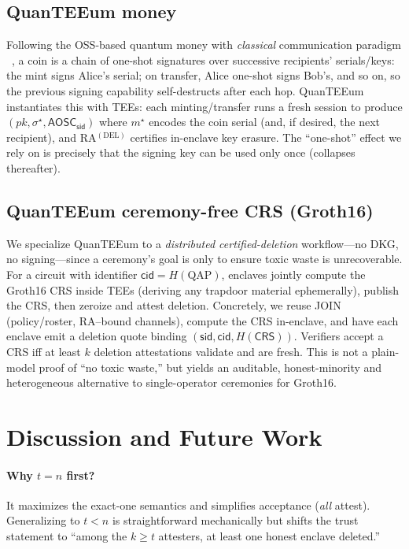 \documentclass[runningheads,orivec]{llncs}
\newcommand{\prot}{\textsf{QuanTEEum}}
\newcommand{\sid}{\mathsf{sid}}
\begin{document}
\subsection{QuanTEEum money}
Following the OSS-based quantum money with \emph{classical} communication paradigm ~\cite{shmueli2025one}, a coin is a chain of one-shot signatures over successive recipients’ serials/keys: the mint signs Alice’s serial; on transfer, Alice one-shot signs Bob’s, and so on, so the previous signing capability self-destructs after each hop. \prot{} instantiates this with TEEs: each minting/transfer runs a fresh session to produce $(pk,\sigma^{\star},\mathsf{AOSC}_\sid)$ where $m^{\star}$ encodes the coin serial (and, if desired, the next recipient), and RA$^{(\mathrm{DEL})}$ certifies in-enclave key erasure. The “one-shot” effect we rely on is precisely that the signing key can be used only once (collapses thereafter).

\subsection{QuanTEEum ceremony-free CRS (Groth16)}
We specialize \prot{} to a \emph{distributed certified-deletion} workflow—no DKG, no signing—since a ceremony’s goal is only to ensure toxic waste is unrecoverable. For a circuit with identifier $\mathsf{cid}=H(\text{QAP})$, enclaves jointly compute the Groth16 CRS inside TEEs (deriving any trapdoor material ephemerally), publish the CRS, then zeroize and attest deletion. Concretely, we reuse JOIN (policy/roster, RA–bound channels), compute the CRS in-enclave, and have each enclave emit a deletion quote binding $(\sid,\mathsf{cid},H(\mathsf{CRS}))$. Verifiers accept a CRS iff at least $k$ deletion attestations validate and are fresh. This is not a plain-model proof of “no toxic waste,” but yields an auditable, honest-minority and heterogeneous alternative to single-operator ceremonies for Groth16.

\section{Discussion and Future Work}\label{sec:discussion}
\paragraph{Why $t\!=\!n$ first?}
It maximizes the exact-one semantics and simplifies acceptance (\emph{all} attest). Generalizing to $t<n$ is straightforward mechanically but shifts the trust statement to “among the $k\!\ge\!t$ attesters, at least one honest enclave deleted.”
\end{document}
